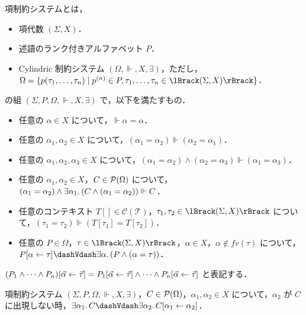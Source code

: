 \begin{definition}
  項制約システムとは，
  \begin{itemize}
    \item 項代数 $(\Sigma, X)$．
    \item 述語のランク付きアルファベット $P$．
    \item Cylindric 制約システム $(\Omega, \Vdash, X, \exists)$，ただし，$\Omega = \{p(\tau_1, \ldots, \tau_n)\mid p^{(n)} \in P, \tau_1, \ldots, \tau_n \in \semanticf{(\Sigma, X)}\}$．
  \end{itemize}
  の組 $(\Sigma, P, \Omega, \Vdash, X, \exists)$ で，以下を満たすもの．
  \begin{itemize}
    \item 任意の $\alpha \in X$ について，$\Vdash \alpha = \alpha$．
    \item 任意の $\alpha_1, \alpha_2 \in X$ について，$(\alpha_1 = \alpha_2) \Vdash (\alpha_2 = \alpha_1)$．
    \item 任意の $\alpha_1, \alpha_2, \alpha_3 \in X$ について，$(\alpha_1 = \alpha_2) \land (\alpha_2 = \alpha_3) \Vdash (\alpha_1 = \alpha_3)$．
    \item 任意の $\alpha_1, \alpha_2 \in X$，$C \in \mathcal{P}(\Omega)$ について，$(\alpha_1 = \alpha_2) \land \exists \alpha_1\ldotp (C \land (\alpha_1 = \alpha_2)) \Vdash C$．
    \item 任意のコンテキスト $T[] \in \mathcal{C}(\mathcal{T})$，$\tau_1, \tau_2 \in \semanticf{(\Sigma, X)}$ について，$(\tau_1 = \tau_2) \Vdash (T[\tau_1] = T[\tau_2])$．
    \item 任意の $P \in \Omega$，$\tau \in \semanticf{(\Sigma, X)}$，$\alpha \in X$，$\alpha \not\in \mathit{fv}(\tau)$ について，$P[\alpha \assign \tau] \dashVdash \exists \alpha\ldotp (P \land (\alpha = \tau))$．
  \end{itemize}
\end{definition}

\begin{definition}[置換の拡張]
  $(P_1 \land \cdots \land P_n)[\vec{\alpha} \gets \vec{\tau}] = P_1[\vec{\alpha} \gets \vec{\tau}] \land \cdots \land P_n[\vec{\alpha} \gets \vec{\tau}]$ と表記する．
\end{definition}

\begin{lemma}[改名 (renaming)]
  項制約システム $(\Sigma, P, \Omega, \Vdash, X, \exists)$，$C \in \mathcal{P}(\Omega)$，$\alpha_1, \alpha_2 \in X$ について，$\alpha_2$ が $C$ に出現しない時，$\exists \alpha_1\ldotp C \dashVdash \exists \alpha_2\ldotp C[\alpha_1 \assign \alpha_2]$．
\end{lemma}

